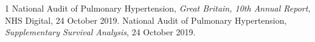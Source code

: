 \documentclass[11pt,a4paper]{article}
\begin{document}

\begin{thebibliography}{1}
 National Audit of Pulmonary Hypertension, \emph{Great Britain, 10th Annual Report}, NHS Digital, 24 October 2019.
 National Audit of Pulmonary Hypertension, \emph{Supplementary Survival Analysis}, 24 October 2019.
\end{thebibliography}
\end{document}
